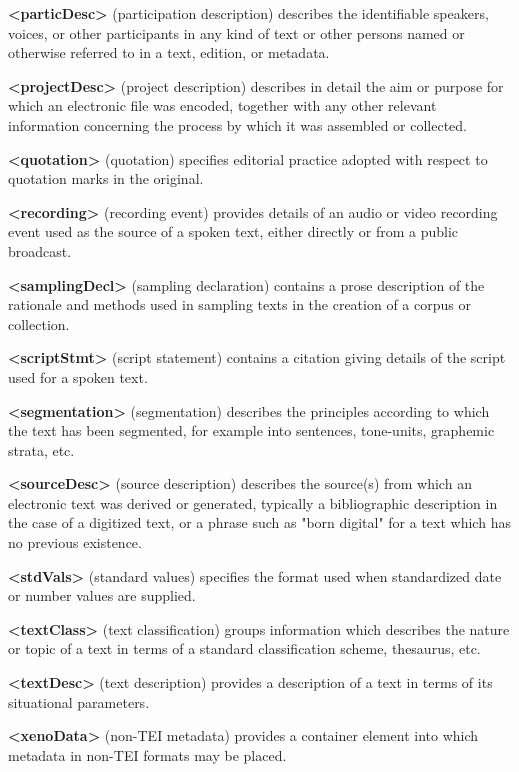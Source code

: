 \begin{sansreflist}
\item [\textbf{<particDesc>}] (participation description) describes the identifiable speakers, voices, or other participants in any kind of text or other persons named or otherwise referred to in a text, edition, or metadata.
\item [\textbf{<projectDesc>}] (project description) describes in detail the aim or purpose for which an electronic file was encoded, together with any other relevant information concerning the process by which it was assembled or collected.
\item [\textbf{<quotation>}] (quotation) specifies editorial practice adopted with respect to quotation marks in the original.
\item [\textbf{<recording>}] (recording event) provides details of an audio or video recording event used as the source of a spoken text, either directly or from a public broadcast.
\item [\textbf{<samplingDecl>}] (sampling declaration) contains a prose description of the rationale and methods used in sampling texts in the creation of a corpus or collection.
\item [\textbf{<scriptStmt>}] (script statement) contains a citation giving details of the script used for a spoken text.
\item [\textbf{<segmentation>}] (segmentation) describes the principles according to which the text has been segmented, for example into sentences, tone-units, graphemic strata, etc.
\item [\textbf{<sourceDesc>}] (source description) describes the source(s) from which an electronic text was derived or generated, typically a bibliographic description in the case of a digitized text, or a phrase such as "born digital" for a text which has no previous existence.
\item [\textbf{<stdVals>}] (standard values) specifies the format used when standardized date or number values are supplied.
\item [\textbf{<textClass>}] (text classification) groups information which describes the nature or topic of a text in terms of a standard classification scheme, thesaurus, etc.
\item [\textbf{<textDesc>}] (text description) provides a description of a text in terms of its situational parameters.
\item [\textbf{<xenoData>}] (non-TEI metadata) provides a container element into which metadata in non-TEI formats may be placed.
\end{sansreflist}
